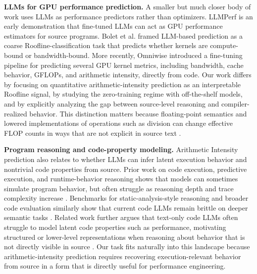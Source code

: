 \textbf{LLMs for GPU performance prediction.}
A smaller but much closer body of work uses LLMs as performance predictors rather than optimizers.
LLMPerf \cite{nguyen-nhatLLMPerfGPUPerformance2024} is an early demonstration that fine-tuned LLMs can act as GPU performance estimators for source programs.
Bolet et al. \cite{boletCanLargeLanguage2025} framed LLM-based prediction as a coarse Roofline-classification task that predicts whether kernels are compute-bound or bandwidth-bound.
More recently, Omniwise \cite{wangOmniwisePredictingGPU2025} introduced a fine-tuning pipeline for predicting several GPU kernel metrics, including bandwidth, cache behavior, GFLOPs, and arithmetic intensity, directly from code.
Our work differs by focusing on quantitative arithmetic-intensity prediction as an interpretable Roofline signal, by studying the zero-training regime with off-the-shelf models, and by explicitly analyzing the gap between source-level reasoning and compiler-realized behavior.
This distinction matters because floating-point semantics and lowered implementations of operations such as division can change effective FLOP counts in ways that are not explicit in source text \cite{IEEEStandardFloatingPoint2019,louvetNewtonRaphsonAlgorithmsFloatingpoint2010}.

\textbf{Program reasoning and code-property modeling.}
Arithmetic Intensity prediction also relates to whether LLMs can infer latent execution behavior and nontrivial code properties from source.
Prior work on code execution, predictive execution, and runtime-behavior reasoning shows that models can sometimes simulate program behavior, but often struggle as reasoning depth and trace complexity increase \cite{liuCodeExecutionPretrained2023,lyuLargeLanguageModels2024,liBlendedAnalysisPredictive2025,chenReasoningRuntimeBehavior2025}.
Benchmarks for static-analysis-style reasoning and broader code evaluation similarly show that current code LLMs remain brittle on deeper semantic tasks \cite{xieCOREBenchmarkingLLMs2025,jainLiveCodeBenchHolisticContamination2024}.
Related work further argues that text-only code LLMs often struggle to model latent code properties such as performance, motivating structured or lower-level representations when reasoning about behavior that is not directly visible in source \cite{pydaShortcomingsCodeLLMs2025}.
Our task fits naturally into this landscape because arithmetic-intensity prediction requires recovering execution-relevant behavior from source in a form that is directly useful for performance engineering.

